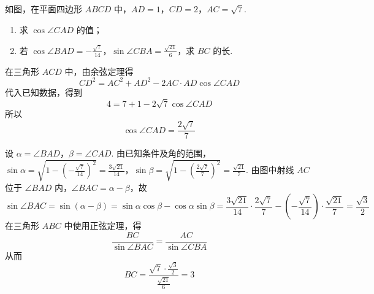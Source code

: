 \begin{problem}
如图，在平面四边形 \(ABCD\) 中，\(AD = 1\)，\(CD = 2\)，\(AC = \sqrt{7}\).

\begin{enumerate}
\item 求 \(\cos \angle CAD\) 的值；
\item 若 \(\cos\angle BAD = -\frac{\sqrt{7}}{14}\)，\(\sin\angle CBA = \frac{\sqrt{21}}{6}\)，求 \(BC\) 的长.
\end{enumerate}


\begin{solution}
在三角形 \(ACD\) 中，由余弦定理得
\[
CD^2=AC^2+AD^2-2AC\cdot AD\cos\angle CAD
\]
代入已知数据，得到
\[
4=7+1-2\sqrt7\cos\angle CAD
\]
所以
\[
\cos\angle CAD=\frac{2\sqrt7}{7}
\]

设 \(\alpha=\angle BAD\)，\(\beta=\angle CAD\). 由已知条件及角的范围，
\(\sin\alpha=\sqrt{1-\left(-\frac{\sqrt7}{14}\right)^2}=\frac{3\sqrt{21}}{14}\)，\(\sin\beta=\sqrt{1-\left(\frac{2\sqrt7}{7}\right)^2}=\frac{\sqrt{21}}{7}\).
由图中射线 \(AC\) 位于 \(\angle BAD\) 内，\(\angle BAC=\alpha-\beta\)，故
\[
\sin\angle BAC
=\sin(\alpha-\beta)
=\sin\alpha\cos\beta-\cos\alpha\sin\beta
=\frac{3\sqrt{21}}{14}\cdot\frac{2\sqrt7}{7}
-\left(-\frac{\sqrt7}{14}\right)\cdot\frac{\sqrt{21}}{7}
=\frac{\sqrt3}{2}
\]
在三角形 \(ABC\) 中使用正弦定理，得
\[
\frac{BC}{\sin\angle BAC}=\frac{AC}{\sin\angle CBA}
\]
从而
\[
BC=\frac{\sqrt7\cdot\frac{\sqrt3}{2}}{\frac{\sqrt{21}}{6}}=3
\]
\end{solution}
\end{problem}


